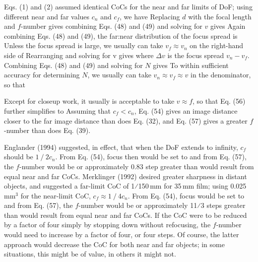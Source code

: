 \documentclass[11pt, oneside]{scrartcl}   	%
\begin{document}
Eqs. (1) and (2) assumed identical CoCs for the near and far limits of DoF; using different near and far values $c_n$ and $c_f$, we have
Replacing $d$ with the focal length and $f$-number gives
combining Eqs. (48) and (49) and solving for $v$ gives
Again combining Eqs. (48) and (49), the far:near distribution of the focus spread is
Unless the focus spread is large, we usually can take $v_f \approx v_n$ on the right-hand side of
Rearranging and solving for v gives
where $Δv$ is the focus spread $v_n - v_f$. Combining Eqs. (48) and (49) and solving for $N$ gives
To within sufficient accuracy for determining $N$, we usually can take $v_n \approx v_f \approx v$ in the denominator, so that

Except for closeup work, it usually is acceptable to take $v \approx f$, so that Eq. (56) further simplifies to
Assuming that $c_f < c_n$, Eq. (54) gives an image distance closer to the far image distance than does Eq. (32), and Eq. (57) gives a greater $f$-number than does Eq. (39).

Englander (1994) suggested, in effect, that when the DoF extends to infinity, $c_f$ should be $1⁄2 c_n$. From Eq. (54), focus then would be set to
and from Eq. (57), the $f$-number would be
or approximately 0.83 step greater than would result from equal near and far CoCs. Merklinger (1992) desired greater sharpness in distant objects, and suggested a far-limit CoC of 1⁄150\,mm for 35\,mm film; using 0.025\,mm$^3$ for the near-limit CoC, $c_f \approx 1⁄4 c_n$. From Eq. (54), focus would be set to
and from Eq. (57), the $f$-number would be
or approximately 11⁄3 steps greater than would result from equal near and far CoCs. If the CoC were to be reduced by a factor of four simply by stopping down without refocusing, the $f$-number would need to increase by a factor of four, or four steps. Of course, the latter approach would decrease the CoC for both near and far objects; in some situations, this might be of value, in others it might not.

\end{document}
